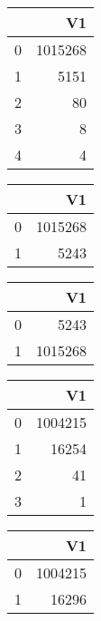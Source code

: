 \bigskip\bigskip
\centering
\begin{tabular}{rr}
  \hline
 & V1 \\ 
  \hline
0 & 1015268 \\ 
  1 & 5151 \\ 
  2 &  80 \\ 
  3 &   8 \\ 
  4 &   4 \\ 
   \hline
\end{tabular}

\bigskip\bigskip
\centering
\begin{tabular}{rr}
  \hline
 & V1 \\ 
  \hline
0 & 1015268 \\ 
  1 & 5243 \\ 
   \hline
\end{tabular}

\bigskip\bigskip
\centering
\begin{tabular}{rr}
  \hline
 & V1 \\ 
  \hline
0 & 5243 \\ 
  1 & 1015268 \\ 
   \hline
\end{tabular}

\bigskip\bigskip
\centering
\begin{tabular}{rr}
  \hline
 & V1 \\ 
  \hline
0 & 1004215 \\ 
  1 & 16254 \\ 
  2 &  41 \\ 
  3 &   1 \\ 
   \hline
\end{tabular}

\bigskip\bigskip
\centering
\begin{tabular}{rr}
  \hline
 & V1 \\ 
  \hline
0 & 1004215 \\ 
  1 & 16296 \\ 
   \hline
\end{tabular}

